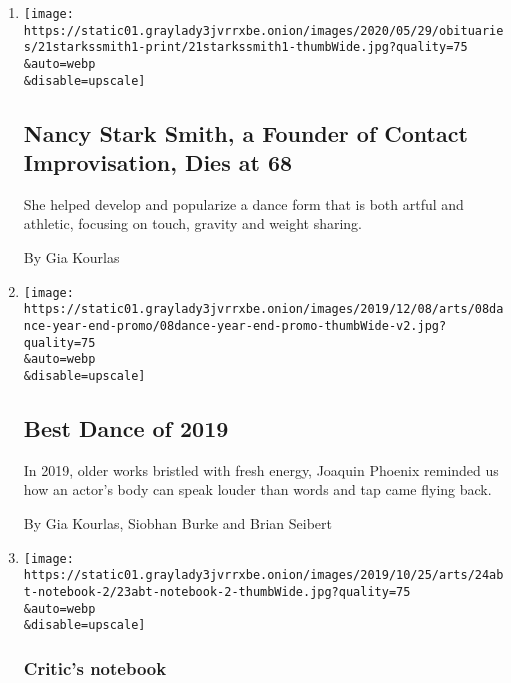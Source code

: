 \begin{enumerate}
\def\labelenumi{\arabic{enumi}.}
\item
  \href{/2020/05/27/arts/dance/nancy-stark-smith-dead.html}{}

  \texttt{[image: https://static01.graylady3jvrrxbe.onion/images/2020/05/29/obituaries/21starkssmith1-print/21starkssmith1-thumbWide.jpg?quality=75\\\&auto=webp\\\&disable=upscale]}

  \hypertarget{nancy-stark-smith-a-founder-of-contact-improvisation-dies-at-68}{%
  \subsection{Nancy Stark Smith, a Founder of Contact Improvisation,
  Dies at
  68}\label{nancy-stark-smith-a-founder-of-contact-improvisation-dies-at-68}}

  She helped develop and popularize a dance form that is both artful and
  athletic, focusing on touch, gravity and weight sharing.

  By Gia Kourlas
\item
  \href{/2019/12/06/arts/dance/best-dance.html}{}

  \texttt{[image: https://static01.graylady3jvrrxbe.onion/images/2019/12/08/arts/08dance-year-end-promo/08dance-year-end-promo-thumbWide-v2.jpg?quality=75\\\&auto=webp\\\&disable=upscale]}

  \hypertarget{best-dance-of-2019}{%
  \subsection{Best Dance of 2019}\label{best-dance-of-2019}}

  In 2019, older works bristled with fresh energy, Joaquin Phoenix
  reminded us how an actor's body can speak louder than words and tap
  came flying back.

  By Gia Kourlas, Siobhan Burke and Brian Seibert
\item
  \href{/2019/10/24/arts/dance/ABT-apollo-james-whiteside-gemma-bond.html}{}

  \texttt{[image: https://static01.graylady3jvrrxbe.onion/images/2019/10/25/arts/24abt-notebook-2/23abt-notebook-2-thumbWide.jpg?quality=75\\\&auto=webp\\\&disable=upscale]}

  \hypertarget{critics-notebook}{%
  \subsubsection{Critic's notebook}\label{critics-notebook}}


\end{enumerate}
